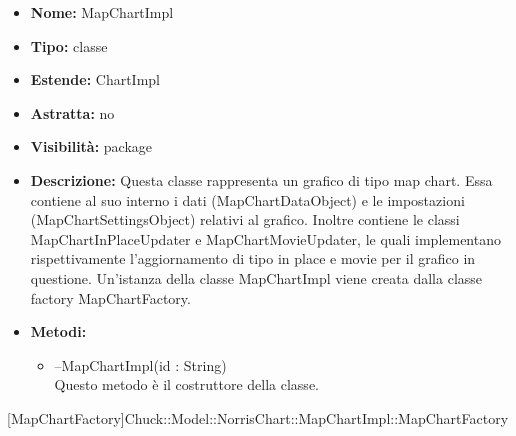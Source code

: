 	
			
			\begin{itemize}
			\item \textbf{Nome:} MapChartImpl
			\item \textbf{Tipo:} classe
			
		\item \textbf{Estende:}
		ChartImpl
		\item \textbf{Astratta:}
		no
			\item \textbf{Visibilità:} package
			\item \textbf{Descrizione:} Questa classe rappresenta un grafico di tipo map chart. Essa contiene al suo interno i dati (MapChartDataObject) e le impostazioni (MapChartSettingsObject) relativi al grafico. Inoltre contiene le classi MapChartInPlaceUpdater e MapChartMovieUpdater, le quali implementano rispettivamente l'aggiornamento di tipo in place e movie per il grafico in questione. Un'istanza della classe MapChartImpl viene creata dalla classe factory MapChartFactory.
			\item \textbf{Metodi:}
				\begin{itemize}
				\setlength{\itemsep}{5pt}
				
					\item[\ding{111}] {{--MapChartImpl(id : String)}} \\ [1mm] Questo metodo è il costruttore della classe.
				\end{itemize}
		
			\end{itemize}

			
			[MapChartFactory]{Chuck::Model::NorrisChart::MapChartImpl::MapChartFactory}
			

